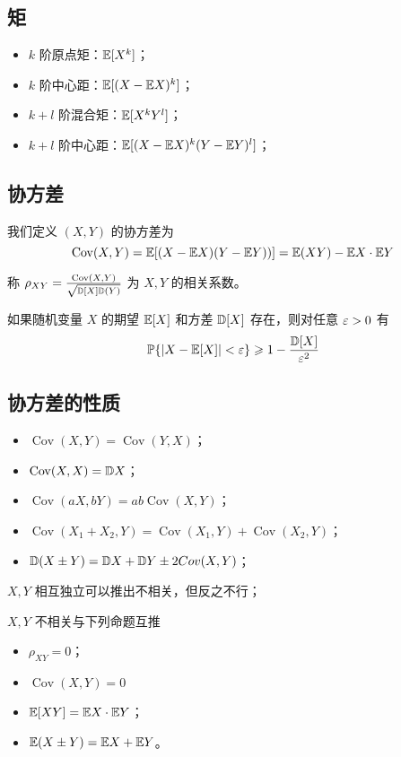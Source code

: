 \subsection*{矩}
\begin{itemize}
	\item $k$ 阶原点矩：$\mathbb{E}[X^k]$；
	\item $k$ 阶中心距：$\mathbb{E}[(X - \mathbb{E} X)^k]$；
	\item $k + l$ 阶混合矩：$\mathbb{E}[X^k Y^l]$；
	\item $k + l$ 阶中心距：$\mathbb{E}[(X - \mathbb{E} X)^k (Y - \mathbb{E} Y)^l]$；
\end{itemize}

\subsection*{协方差}

\newcommand{\opCov}{\operatorname{Cov}}

我们定义 $(X, Y)$ 的协方差为
\[ \opCov(X, Y) = \bbE[(X - \bbE X)(Y - \bbE Y))] = \bbE(XY) - \bbE X \cdot \bbE Y \]

称 $\rho_{XY} = \frac{\opCov(X, Y)}{\sqrt{\bbD [X] \bbD(Y)}}$ 为 $X, Y$ 的相关系数。

\begin{theorem}[切比雪夫不等式]
	如果随机变量 $X$ 的期望 $\mathbb{E} [X]$ 和方差 $\mathbb{D} [X]$ 存在，则对任意 $\varepsilon > 0$ 有
	\[ \mathbb{P}\{|X - \mathbb{E} [X]| < \varepsilon\} \geqslant 1 - \frac{\mathbb{D} [X]}{\varepsilon^2} \]
\end{theorem}



\subsection*{协方差的性质}

\begin{itemize}
	\item $\opCov(X, Y) = \opCov(Y, X)$；
	\item $\opCov(X, X) = \bbD X$；
	\item $\opCov(aX, bY) = ab \opCov(X, Y)$；
	\item $\opCov(X_1 + X_2, Y) = \opCov(X_1, Y) + \opCov(X_2, Y)$；
	\item $\mathbb{D}(X \pm Y) = \mathbb{D} X + \mathbb{D} Y \pm 2Cov(X, Y)$；
\end{itemize}

$X, Y$ 相互独立可以推出不相关，但反之不行；

$X, Y$ 不相关与下列命题互推
\begin{itemize}
	\item $\rho_{XY} = 0$；
	\item $\opCov(X, Y) = 0$
	\item $\mathbb{E}[XY] = \mathbb{E} X \cdot \mathbb{E} Y$；
	\item $\mathbb{E}(X \pm Y) = \mathbb{E} X + \mathbb{E} Y$。
\end{itemize}

